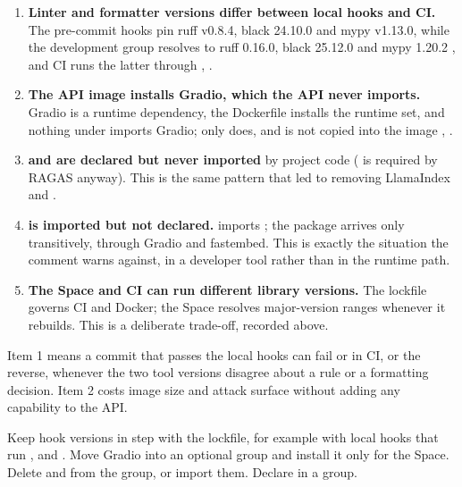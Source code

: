 \begin{enumerate}
  \item \textbf{Linter and formatter versions differ between local hooks and CI.} The pre-commit hooks pin ruff v0.8.4, black 24.10.0 and mypy v1.13.0, while the development group resolves to ruff 0.16.0, black 25.12.0 and mypy 1.20.2 \tagM, and CI runs the latter through  , .
  \item \textbf{The API image installs Gradio, which the API never imports.} Gradio is a runtime dependency, the Dockerfile installs the runtime set, and nothing under  imports Gradio; only  does, and  is not copied into the image , .
  \item \textbf{ and  are declared but never imported} by project code ( is required by RAGAS anyway). This is the same pattern that led to removing LlamaIndex and .
  \item \textbf{ is imported but not declared.}  imports ; the package arrives only transitively, through Gradio and fastembed. This is exactly the situation the  comment warns against, in a developer tool rather than in the runtime path.
  \item \textbf{The Space and CI can run different library versions.} The lockfile governs CI and Docker; the Space resolves major-version ranges whenever it rebuilds. This is a deliberate trade-off, recorded above.
\end{enumerate}

\begin{inferred}
Item 1 means a commit that passes the local hooks can fail  or  in CI, or the reverse, whenever the two tool versions disagree about a rule or a formatting decision. Item 2 costs image size and attack surface without adding any capability to the API.
\end{inferred}

\begin{recommended}
Keep hook versions in step with the lockfile, for example with local hooks that run ,  and . Move Gradio into an optional  group and install it only for the Space. Delete  and  from the  group, or import them. Declare  in a  group.
\end{recommended}

